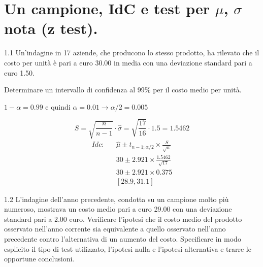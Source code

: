 \documentclass[
  11pt,
]{book}
\theoremstyle{mytheoremstyle}
\theoremstyle{mydefstyle}
\newenvironment{sol}
  {
  \begin{tcolorbox}[enhanced,breakable,arc=0.1mm,boxrule=1pt,colback=white,colframe=iblue,
  title=\bf \fontfamily{lmss}\selectfont \hspace{.5 cm} Soluzione,drop fuzzy shadow]

}{
\end{tcolorbox}
  }
\begin{document}
\section{\texorpdfstring{Un campione, IdC e test per \(\mu\), \(\sigma\) nota (z test).}{Un campione, IdC e test per \textbackslash mu, \textbackslash sigma nota (z test).}}\label{un-campione-idc-e-test-per-mu-sigma-nota-z-test.}

1.1 Un'indagine in 17 aziende, che producono lo stesso prodotto,
ha rilevato che il costo per unità è pari a euro 30.00
in media con una deviazione standard pari a euro 1.50.

Determinare un intervallo di confidenza al 99\%
per il costo medio per unità.

\begin{sol}
\(1-\alpha =0.99\) e quindi \(\alpha=0.01\rightarrow \alpha/2=0.005\)

\[
      S  =\sqrt{\frac {n}{n-1}}\cdot\hat\sigma =
     \sqrt{\frac { 17 }{ 16 }}\cdot 1.5 = 1.5462 
\]
\begin{eqnarray*}
  Idc: & &  \hat\mu \pm  t_{n-1;\alpha/2} \times \frac{S}{\sqrt{n}} \\
     & &  30 \pm  2.921 \times \frac{ 1.5462 }{\sqrt{ 17 }} \\
     & &  30 \pm  2.921 \times  0.375 \\
     & & [ 28.9 ,  31.1 ]
\end{eqnarray*}

\end{sol}

1.2 L'indagine dell'anno precedente, condotta
su un campione molto più numeroso, mostrava un costo medio
pari a euro 29.00 con una deviazione standard pari a 2.00 euro.
Verificare l'ipotesi che il costo medio del prodotto osservato
nell'anno corrente sia equivalente a quello osservato nell'anno
precedente contro l'alternativa di un aumento del costo.
Specificare in modo esplicito il tipo di test utilizzato,
l'ipotesi nulla e l'ipotesi alternativa e trarre le opportune
conclusioni.
\end{document}
